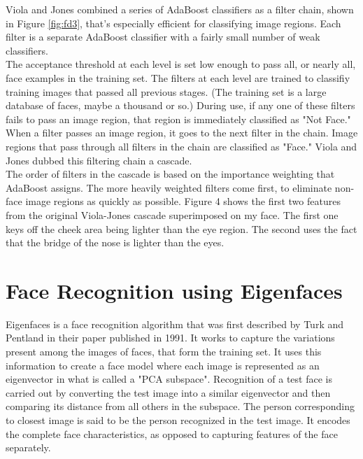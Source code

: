 \documentclass[12pt]{report}			%
\begin{document}
Viola and Jones combined a series of AdaBoost classifiers as a filter chain, shown in Figure \ref{fig:fd3}, that's especially efficient for classifying image regions. Each filter is a separate AdaBoost classifier with a fairly small number of weak classifiers.\\
The acceptance threshold at each level is set low enough to pass all, or nearly all, face examples in the training set. The filters at each level are trained to classifiy training images that passed all previous stages. (The training set is a large database of faces, maybe a thousand or so.) During use, if any one of these filters fails to pass an image region, that region is immediately classified as "Not Face." When a filter passes an image region, it goes to the next filter in the chain. Image regions that pass through all filters in the chain are classified as "Face." Viola and Jones dubbed this filtering chain a cascade.\\
The order of filters in the cascade is based on the importance weighting that AdaBoost assigns. The more heavily weighted filters come first, to eliminate non-face image regions as quickly as possible. Figure 4 shows the first two features from the original Viola-Jones cascade superimposed on my face. The first one keys off the cheek area being lighter than the eye region. The second uses the fact that the bridge of the nose is lighter than the eyes.


\section{ Face Recognition using Eigenfaces }
Eigenfaces is a face recognition algorithm that was first described by Turk and Pentland in their paper published in 1991. It works to capture the variations present among the images of faces, that form the training set. It uses this information to create a face model where each image is represented as an eigenvector in what is called a "PCA subspace". Recognition of a test face is carried out by converting the test image into a similar eigenvector and then comparing its distance from all others in the subspace. The person corresponding to closest image is said to be the person recognized in the test image. It encodes the complete face characteristics, as opposed to capturing features of the face separately.\\
\end{document}
